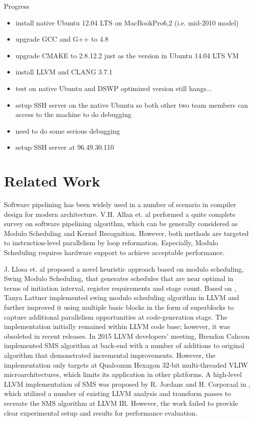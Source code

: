 \documentclass[letterpaper, 10 pt, conference]{ieeeconf}  %
\begin{document}
Progress

\begin{itemize}
\item install native Ubuntu 12.04 LTS on MacBookPro6,2 (i.e. mid-2010 model)
\item upgrade GCC and G++ to 4.8
\item upgrade CMAKE to 2.8.12.2 just as the version in Ubuntu 14.04 LTS VM
\item install LLVM and CLANG 3.7.1
\item test on native Ubuntu and DSWP optimized version still hangs...
\item setup SSH server on the native Ubuntu so both other two team members can access to the machine to do debugging
\item need to do some serious debugging
\item setup SSH server at 96.49.30.110
\end{itemize}

\section{Related Work}
Software pipelining has been widely used in a number of scenario in compiler design for modern architecture. V.H. Allan et. al performed a quite complete survey on software pipelining algorithm, which can be generally considered as Modulo Scheduling and Kernel Recognition. However, both methods are targeted to instruction-level parallelism by loop reformation. Especially, Modulo Scheduling requires hardware support to achieve acceptable performance. 

J. Llosa et. al proposed a novel heuristic approach based on modulo scheduling, Swing Modulo Scheduling, that generates schedules that are near optimal in terms of initiation interval, register requirements and stage count. Based on \cite{c13}, Tanya Lattner \cite{c8} implemented swing modulo scheduling algorithm in LLVM and further improved it using multiple basic blocks in the form of superblocks to capture additional parallelism opportunities at code-generation stage. The implementation initially remained within LLVM code base; however, it was obsoleted in recent releases. In 2015 LLVM developers' meeting, Brendon Cahoon implemented SMS algorithm at back-end with a number of additions to original algorithm that demonstrated incremental improvements. However, the implementation only targets at Qualcomm Hexagon 32-bit multi-threaded VLIW microarchitectures, which limits its application in other platforms. A high-level LLVM implementation of SMS was proposed by R. Jordans and H. Corporaal in \cite{c9}, which utilized a number of existing LLVM analysis and transform passes to recreate the SMS algorithm at LLVM IR. However, the work failed to provide clear experimental setup and results for performance evaluation. 
\end{document}
